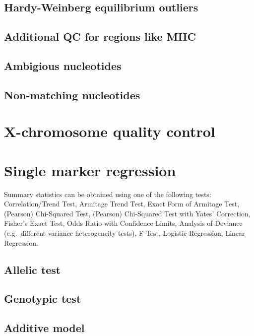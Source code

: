 \documentclass[]{book}
\theoremstyle{definition}
\theoremstyle{definition}
\theoremstyle{definition}
\theoremstyle{remark}
\begin{document}
\subsection{Hardy-Weinberg equilibrium
outliers}\label{hardy-weinberg-equilibrium-outliers}

\subsection{Additional QC for regions like
MHC}\label{additional-qc-for-regions-like-mhc}

\subsection{Ambigious nucleotides}\label{ambigious-nucleotides}

\subsection{Non-matching nucleotides}\label{non-matching-nucleotides}

\section{X-chromosome quality
control}\label{x-chromosome-quality-control}

\section{Single marker regression}\label{single-marker-regression}

Summary statistics can be obtained using one of the following tests:
Correlation/Trend Test, Armitage Trend Test, Exact Form of Armitage
Test, (Pearson) Chi-Squared Test, (Pearson) Chi-Squared Test with Yates'
Correction, Fisher's Exact Test, Odds Ratio with Confidence Limits,
Analysis of Deviance (e.g.~different variance heterogeneity tests),
F-Test, Logistic Regression, Linear Regression.

\subsection{Allelic test}\label{allelic-test}

\subsection{Genotypic test}\label{genotypic-test}

\subsection{Additive model}\label{additive-model}
\end{document}
